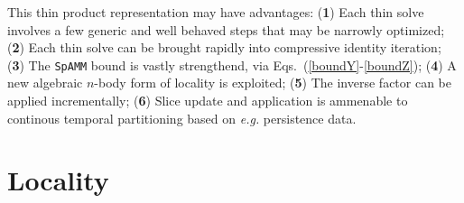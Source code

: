 \documentclass[letterpaper,twocolumn,amsmath,amsfont,amssymb,english,aps,jcp,preprintnumbers,groupaddress,nofootinbib,tightenlines,floatfix]{revtex4}
\newcommand{\mat}[1]{\boldsymbol{#1}}
\theoremstyle{plain}
\theoremstyle{remark}
\theoremstyle{plain}
\begin{document}
This thin product representation may have advantages: 
({\bf{1}}) Each thin solve involves a few generic and well behaved steps that may be narrowly optimized;
({\bf{2}}) Each thin solve can be brought rapidly into compressive identity iteration; 
({\bf{3}}) The {\tt SpAMM} bound is vastly strengthend, via Eqs.~(\ref{boundY}-\ref{boundZ}); 
({\bf{4}}) A new algebraic $n$-body form of locality is exploited; 
({\bf{5}}) The inverse factor can be applied incrementally;
({\bf{6}}) Slice update and application is ammenable to continous temporal partitioning based on {\em e.g.} persistence data.



\section{Locality} 
\end{document}
